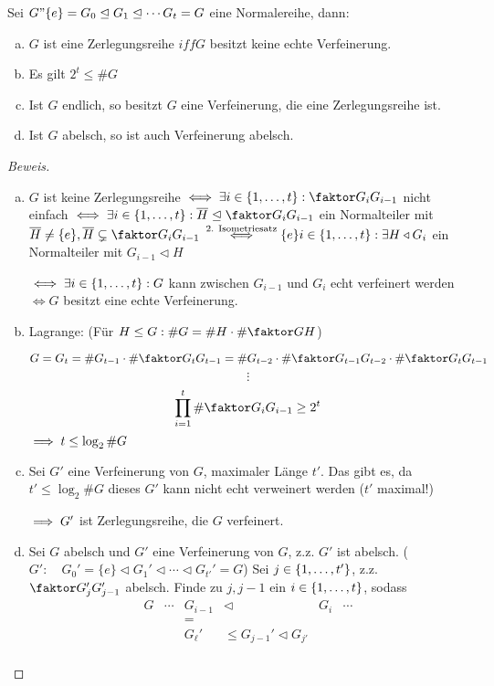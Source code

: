 \documentclass[a4paper]{report}
\begin{document}
\begin{prop} %
  Sei $G " \{e\} = G_{0} \trianglelefteq G_{1} \trianglelefteq \cdots G_{t} = G$ eine Normalereihe, dann:
  \begin{enumerate}[(a)]
    \item $G$ ist eine Zerlegungsreihe $iff G$ besitzt keine echte Verfeinerung.
    \item Es gilt $2^{t} \le \#G$
    \item Ist $G$ endlich, so besitzt $G$ eine Verfeinerung, die eine Zerlegungsreihe ist.
    \item Ist $G$ abelsch, so ist auch Verfeinerung abelsch.
  \end{enumerate}
\begin{proof}[Beweis]
  \begin{enumerate}[(a)]
    \item $G$ ist keine Zerlegungsreihe $\iff \ex i \in \eb t : \fak {G_{i}}{G_{i-1}}$ nicht einfach $\iff \ex i \in \eb t : \bar H \nt \fak {G_{i}}{G_{i-1}}$ ein Normalteiler mit $\bar H \ne \{e\}, \bar H \subsetneq \fak {G_{i}}{G_{i-1}}$
          $\overset{\text{2. Isometriesatz}} \iff \{e\} i \in \{1, \ldots, t\} : \exists H \triangleleft G_{i} $ ein Normalteiler mit $G_{i-1} \triangleleft H$

          $\iff \exists i \in \{1, \ldots, t\} : G$ kann zwischen $G_{i-1}$ und $G_{i}$ echt verfeinert werden $\iff G$ besitzt eine echte Verfeinerung.
    \item Lagrange: (Für $H \le G : \#G = \#H \cdot \# \fak GH$)

          \[G = G_{t} = \#G_{t-1} \cdot \#\fak{G_{t}}{G_{t-1}} = \#G_{t-2} \cdot \# \fak {G_{t-1}}{G_{t-2}}\cdot \#\fak{G_{t}}{G_{t-1}}\]
          \[\vdots\]
          \[\prod_{i=1}^{t}\#\fak{G_{i}}{G_{i-1}} \ge 2^{t}\]
          $\implies t \le \log_{2} \#G$
    \item Sei $G'$ eine Verfeinerung von $G$, maximaler Länge $t'$. Das gibt es, da $t' \le \log_{2} \#G$ dieses $G'$ kann nicht echt verweinert werden ($t'$ maximal!)

          $\implies G'$ ist Zerlegungsreihe, die $G$ verfeinert.
    \item Sei $G$ abelsch und $G'$ eine Verfeinerung von $G$, z.z. $G'$ ist abelsch.
          ($G' :\quad G_{0}' = \{e\} \triangleleft G_{1}' \triangleleft \cdots \triangleleft G_{t'}' = G$)
          Sei $j \in \{1, \ldots, t'\}$, z.z. $\fak{G_{j}'}{G_{j-1}'}$ abelsch. Finde zu $j, j-1$ ein $i \in \{1, \ldots, t\}$, sodass
          \[\begin{matrix}
              G & \cdots & G_{i-1} & \triangleleft & G_{i} & \cdots \\
                & & = \\
                & & G_{\ell}' & \le G_{j-1}' \triangleleft G_{j'} \\
            \end{matrix}
          \]
  \end{enumerate}
\end{proof}
\end{prop}
\end{document}
